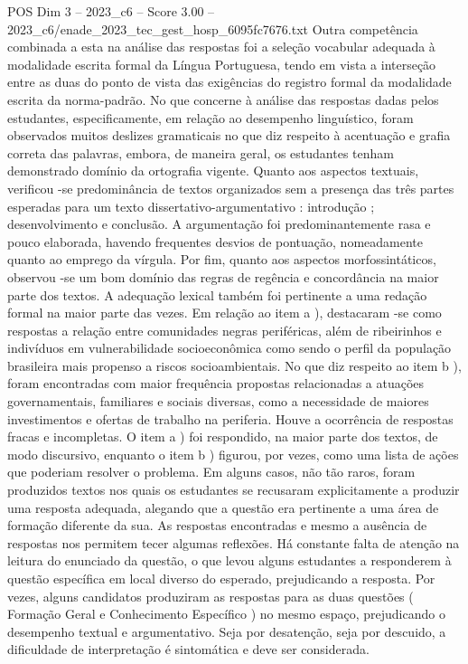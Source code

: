 \begin{textsample}{POS Dim 3 – 2023\_c6 – Score 3.00 – 2023\_c6/enade\_2023\_tec\_gest\_hosp\_6095fc7676.txt}
Outra competência combinada a esta na análise das respostas foi a seleção vocabular adequada à modalidade escrita formal da Língua Portuguesa, tendo em vista a interseção entre as duas do ponto de vista das exigências do registro formal da modalidade escrita da norma-padrão.
No que concerne à análise das respostas dadas pelos estudantes, especificamente, em relação ao desempenho linguístico, foram observados muitos deslizes gramaticais no que diz respeito à acentuação e grafia correta das palavras, embora, de maneira geral, os estudantes tenham demonstrado domínio da ortografia vigente.
Quanto aos aspectos textuais, verificou -se predominância de textos organizados sem a presença das três partes esperadas para um texto dissertativo-argumentativo : introdução ; desenvolvimento e conclusão.
A argumentação foi predominantemente rasa e pouco elaborada, havendo frequentes desvios de pontuação, nomeadamente quanto ao emprego da vírgula.
Por fim, quanto aos aspectos morfossintáticos, observou -se um bom domínio das regras de regência e concordância na maior parte dos textos.
A adequação lexical também foi pertinente a uma redação formal na maior parte das vezes.
Em relação ao item a ), destacaram -se como respostas a relação entre comunidades negras periféricas, além de ribeirinhos e indivíduos em vulnerabilidade socioeconômica como sendo o perfil da população brasileira mais propenso a riscos socioambientais.
No que diz respeito ao item b ), foram encontradas com maior frequência propostas relacionadas a atuações governamentais, familiares e sociais diversas, como a necessidade de maiores investimentos e ofertas de trabalho na periferia.
Houve a ocorrência de respostas fracas e incompletas.
O item a ) foi respondido, na maior parte dos textos, de modo discursivo, enquanto o item b ) figurou, por vezes, como uma lista de ações que poderiam resolver o problema.
Em alguns casos, não tão raros, foram produzidos textos nos quais os estudantes se recusaram explicitamente a produzir uma resposta adequada, alegando que a questão era pertinente a uma área de formação diferente da sua.
As respostas encontradas e mesmo a ausência de respostas nos permitem tecer algumas reflexões.
Há constante falta de atenção na leitura do enunciado da questão, o que levou alguns estudantes a responderem à questão específica em local diverso do esperado, prejudicando a resposta.
Por vezes, alguns candidatos produziram as respostas para as duas questões ( Formação Geral e Conhecimento Específico ) no mesmo espaço, prejudicando o desempenho textual e argumentativo.
Seja por desatenção, seja por descuido, a dificuldade de interpretação é sintomática e deve ser considerada.

\end{textsample}
